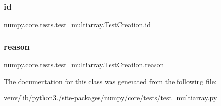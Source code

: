 \subsubsection{\texorpdfstring{id}{id}}
{\footnotesize\ttfamily numpy.\+core.\+tests.\+test\+\_\+multiarray.\+Test\+Creation.\+id\hspace{0.3cm}{\ttfamily [static]}}

\mbox{\label{classnumpy_1_1core_1_1tests_1_1test__multiarray_1_1TestCreation_a61787cc3baf26126999cb79d9080cebe}} 
\subsubsection{\texorpdfstring{reason}{reason}}
{\footnotesize\ttfamily numpy.\+core.\+tests.\+test\+\_\+multiarray.\+Test\+Creation.\+reason\hspace{0.3cm}{\ttfamily [static]}}



The documentation for this class was generated from the following file\+:\begin{DoxyCompactItemize}
\item 
venv/lib/python3./site-\/packages/numpy/core/tests/\hyperlink{core_2tests_2test__multiarray_8py}{test\+\_\+multiarray.\+py}\end{DoxyCompactItemize}
